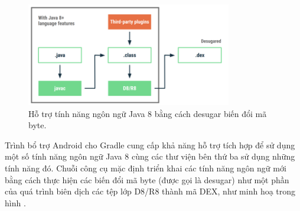         \begin{figure}[H] 
            \centering
            \includegraphics[width=0.8\textwidth]{images/javainandroid.png}
            \caption{Hỗ trợ tính năng ngôn ngữ Java 8 bằng cách desugar biến đổi mã byte.}
            \label{fig:android}
        \end{figure}
        Trình bổ trợ Android cho Gradle cung cấp khả năng hỗ trợ tích hợp để sử dụng một số tính năng ngôn ngữ Java 8 cùng các thư viện bên thứ ba sử dụng những tính năng đó. Chuỗi công cụ mặc định triển khai các tính năng ngôn ngữ mới bằng cách thực hiện các biến đổi mã byte (được gọi là desugar) như một phần của quá trình biên dịch các tệp lớp D8/R8 thành mã DEX, như minh hoạ trong hình \cite{java8}.

